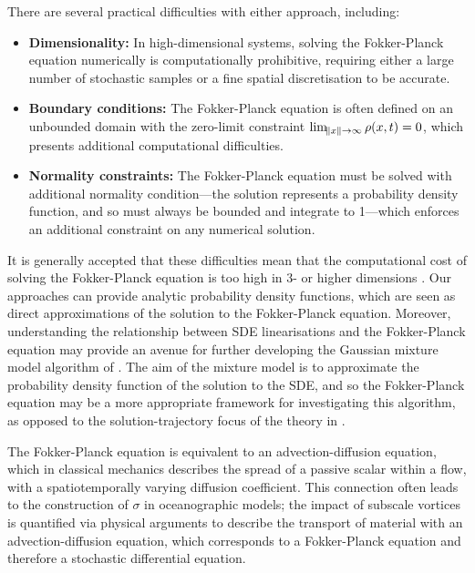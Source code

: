 There are several practical difficulties with either approach, including:
\begin{itemize}
	\item \textbf{Dimensionality:} In high-dimensional systems, solving the Fokker-Planck equation numerically is computationally prohibitive, requiring either  a large number of stochastic samples or a fine spatial discretisation to be accurate.

	\item \textbf{Boundary conditions:} The Fokker-Planck equation is often defined on an unbounded domain with the zero-limit constraint \(\lim_{\norm{x} \to \infty}\rho\!\left(x,t\right) = 0\), which presents additional computational difficulties.

	\item \textbf{Normality constraints:} The Fokker-Planck equation must be solved with additional normality condition---the solution represents a probability density function, and so must always be bounded and integrate to 1---which enforces an additional constraint on any numerical solution.
\end{itemize}
It is generally accepted that these difficulties mean that the computational cost of solving the Fokker-Planck equation is too high in \(3\)- or higher dimensions \citep{ZhaiEtAl_2022_DeepLearningMethod,Li_2019_DatadrivenMethodSteady,AllawalaMarston_2016_StatisticsStochasticallyForced,AndersonFarazmand_2024_FisherInformationShapemorphing}.
Our approaches can provide analytic probability density functions, which are seen as direct approximations of the solution to the Fokker-Planck equation.
Moreover, understanding the relationship between SDE linearisations and the Fokker-Planck equation may provide an avenue for further developing the Gaussian mixture model algorithm of .
The aim of the mixture model is to approximate the probability density function of the solution to the SDE, and so the Fokker-Planck equation may be a more appropriate framework for investigating this algorithm, as opposed to the solution-trajectory focus of the theory in .

The Fokker-Planck equation is equivalent to an advection-diffusion equation, which in classical mechanics describes the spread of a passive scalar within a flow, with a spatiotemporally varying diffusion coefficient.
This connection often leads to the construction of \(\sigma\) in oceanographic models; the impact of subscale vortices is quantified via physical arguments to describe the transport of material with an advection-diffusion equation, which corresponds to a Fokker-Planck equation and therefore a stochastic differential equation.

